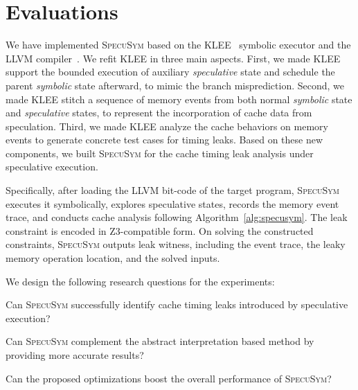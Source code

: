 \documentclass[sigconf]{acmart}
\newcommand\ignore[1]{}
\newcommand{\SpecuSym}{\textsc{SpecuSym} }
\newcommand\sgnote[1]{\textcolor{blue}{{\textbf{Daniel Says: #1}}}}
\begin{document}
\ignore{
From implementation, we skip analyzing memory access that has already 
manifested leakage. Since we assume the target program is leakage-free 
under non-speculative execution, $\mathit{\eta_{in}^\prime(m_i)}$ must be 
0 (miss) or 1 (miss). Meanwhile, if $\mathit{\mu_{in}(m_i)}$ who denotes 
the may-hit condition has a different value to $\mathit{\eta_{in}^\prime(m_i)}$, 
then there must be a new cache behavior, either \textit{Divergent} or 
\textit{Opposite}. Thereby $\theta'$ conforms to $\theta$.

\sgnote{cf. Line 35 of Algorithm~\ref{alg:specusym}. We only build cache 
hit condition on nondeterministic addresses.}
\sgnote{instead of building a lengthy formula for equation~\ref{eqn:hc}, we 
conduct solving upon each preceding access individually. And, once reaching 
a must hit or must miss one, we directly skip it for speedup.} 
}


\section{Evaluations}
\label{sec:evaluation}


We have implemented \SpecuSym based on the KLEE~\cite{CadarDE08} symbolic 
executor and the LLVM compiler~\cite{LattnerA04}. We refit KLEE in three
main aspects. First, we made KLEE support the bounded execution of auxiliary 
\textit{speculative} state and schedule the parent \textit{symbolic} state 
afterward, to mimic the branch misprediction. Second, we made KLEE stitch 
a sequence of memory events from both normal \textit{symbolic} state and 
\textit{speculative} states, to represent the incorporation of cache data 
from speculation. Third, we made KLEE analyze the cache behaviors on memory 
events to generate concrete test cases for timing leaks. Based on these new 
components, we built \SpecuSym for the cache timing leak analysis under 
speculative execution.

Specifically, after loading the LLVM bit-code of the target program, \SpecuSym 
executes it symbolically, explores speculative states, records the memory 
event trace, and conducts cache analysis following Algorithm~\ref{alg:specusym}. 
The leak constraint is encoded in Z3-compatible form. On solving the constructed 
constraints, \SpecuSym outputs leak witness, including the event trace, the leaky 
memory operation location, and the solved inputs. 

We design the following research questions for the experiments: 
\begin{compactitem}
\item Can \SpecuSym successfully identify cache timing leaks introduced 
by speculative execution?
\item Can \SpecuSym complement the abstract interpretation based method 
by providing more accurate results?
\item Can the proposed optimizations boost the overall performance of \textsc{SpecuSym}?
\end{compactitem}
\end{document}
